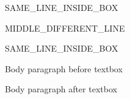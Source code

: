 \documentclass[11pt,a4paper]{article}
\begin{document}
SAME\_LINE\_INSIDE\_BOX

MIDDLE\_DIFFERENT\_LINE

SAME\_LINE\_INSIDE\_BOX

\begin{figure}[h]
\end{figure}

Body paragraph before textbox

Body paragraph after textbox
\end{document}
